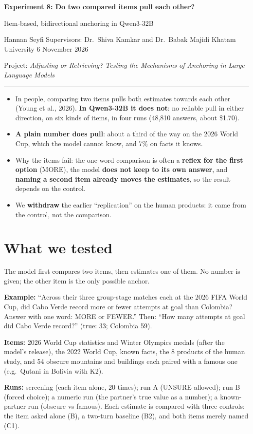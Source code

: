 \documentclass[11pt,a4paper]{article}
\newcommand{\inshort}[1]{\begin{tcolorbox}[colback=gray!6,colframe=gray!50,title=\textbf{In short},fonttitle=\normalsize]#1\end{tcolorbox}}
\newcommand{\header}[3]{%
  {\Large\textbf{#1}}\par\smallskip
  {\large #2}\par\smallskip
  {\small Hannan Seyfi \textperiodcentered{} Supervisors: Dr.\ Shiva Kamkar and Dr.\ Babak Majidi \textperiodcentered{} Khatam University \textperiodcentered{} #3}\par
  {\small Project: \emph{Adjusting or Retrieving? Testing the Mechanisms of Anchoring in Large Language Models}}\par\medskip\hrule\medskip}
\begin{document}
\header{Experiment 8: Do two compared items pull each other?}{Item-based, bidirectional anchoring in Qwen3-32B}{6 November 2026}

\inshort{\begin{itemize}[leftmargin=*]
  \item In people, comparing two items pulls both estimates towards each other (Young et al., 2026). \textbf{In Qwen3-32B it does not}: no reliable pull in either direction, on six kinds of items, in four runs (48,810 answers, about \$1.70).
  \item \textbf{A plain number does pull}: about a third of the way on the 2026 World Cup, which the model cannot know, and 7\% on facts it knows.
  \item Why the items fail: the one-word comparison is often a \textbf{reflex for the first option} (MORE), the model \textbf{does not keep to its own answer}, and \textbf{naming a second item already moves the estimates}, so the result depends on the control.
  \item We \textbf{withdraw} the earlier \enquote{replication} on the human products: it came from the control, not the comparison.
\end{itemize}}

\section*{What we tested}
The model first compares two items, then estimates one of them. No number is given; the other item is the only possible anchor.

\textbf{Example:} \enquote{Across their three group-stage matches each at the 2026 FIFA World Cup, did Cabo Verde record more or fewer attempts at goal than Colombia? Answer with one word: MORE or FEWER.} Then: \enquote{How many attempts at goal did Cabo Verde record?} (true: 33; Colombia 59).

\textbf{Items:} 2026 World Cup statistics and Winter Olympics medals (after the model's release), the 2022 World Cup, known facts, the 8 products of the human study, and 54 obscure mountains and buildings each paired with a famous one (e.g.\ Qutani in Bolivia with K2).

\textbf{Runs:} screening (each item alone, 20 times); run A (UNSURE allowed); run B (forced choice); a numeric run (the partner's true value as a number); a known-partner run (obscure vs famous). Each estimate is compared with three controls: the item asked alone (B), a two-turn baseline (B2), and both items merely named (C1).
\end{document}
